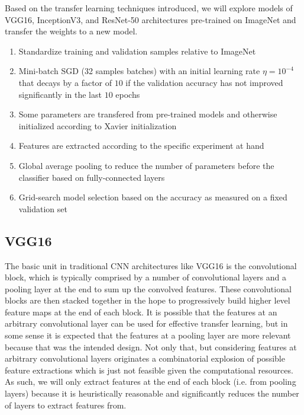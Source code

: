 Based on the transfer learning techniques introduced, we will explore models of VGG16, InceptionV3, and ResNet-50 architectures pre-trained on ImageNet \cite{imagenet} and transfer the weights to a new model.

\begin{enumerate}
    \item Standardize training and validation samples relative to ImageNet
    \item Mini-batch \ac{SGD} (32 samples batches) with an initial learning rate $\eta = 10^{-4}$ that decays by a factor of $10$ if the validation accuracy has not improved significantly in the last $10$ epochs
    \item Some parameters are transfered from pre-trained models and otherwise initialized according to Xavier initialization
    \item Features are extracted according to the specific experiment at hand
    \item Global average pooling to reduce the number of parameters before the classifier based on fully-connected layers
    \item Grid-search model selection based on the accuracy as measured on a fixed validation set
\end{enumerate}


\subsection{VGG16}
The basic unit in traditional \ac{CNN} architectures like VGG16 is the convolutional block, which is typically comprised by a number of convolutional layers and a pooling layer at the end to sum up the convolved features. These convolutional blocks are then stacked together in the hope to progressively build higher level feature maps at the end of each block. It is possible that the features at an arbitrary convolutional layer can be used for effective transfer learning, but in some sense it is expected that the features at a pooling layer are more relevant because that was the intended design. Not only that, but considering features at arbitrary convolutional layers originates a combinatorial explosion of possible feature extractions which is just not feasible given the computational resources. As such, we will only extract features at the end of each block (i.e. from pooling layers) because it is heuristically reasonable and significantly reduces the number of layers to extract features from.

